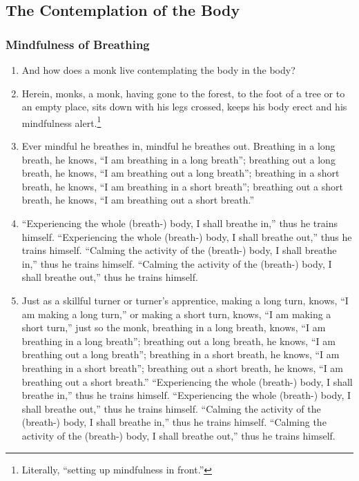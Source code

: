 \documentclass[a4 paper, 12pt]{article}
\begin{document}
\subsection*{The Contemplation of the Body}
\subsubsection*{Mindfulness of Breathing}
\begin{enumerate}[resume]
\item And how does a monk live contemplating the body in the body?
\item Herein, monks, a monk, having gone to the forest, to the foot of a tree or to an empty place, sits down with his legs crossed, keeps his body erect and his mindfulness alert.\footnote{Literally, “setting up mindfulness in front.”}
\item Ever mindful he breathes in, mindful he breathes out. Breathing in a long breath, he knows, “I am breathing in a long breath”; breathing out a long breath, he knows, “I am breathing out a long breath”; breathing in a short breath, he knows, “I am breathing in a short breath”; breathing out a short breath, he knows, “I am breathing out a short breath.”
\item “Experiencing the whole (breath-) body, I shall breathe in,” thus he trains himself. “Experiencing the whole (breath-) body, I shall breathe out,” thus he trains himself. “Calming the activity of the (breath-) body, I shall breathe in,” thus he trains himself. “Calming the activity of the (breath-) body, I shall breathe out,” thus he trains himself.
\item Just as a skillful turner or turner's apprentice, making a long turn, knows, ``I am making a long turn,'' or making a short turn, knows, ``I am making a short turn,'' just so the monk, breathing in a long breath, knows, ``I am breathing in a long breath''; breathing out a long breath, he knows, ``I am breathing out a long breath''; breathing in
a short breath, he knows, “I am breathing in a short breath”; breathing out a short breath, he knows, “I am breathing out a short breath.” “Experiencing the whole (breath-) body, I shall breathe in,” thus he trains himself. “Experiencing the whole (breath-) body, I shall breathe out,” thus he trains himself. “Calming the activity of the (breath-) body, I shall breathe in,” thus he trains himself. “Calming the activity of the (breath-) body, I shall breathe out,” thus he trains himself.

\end{enumerate}
\end{document}
